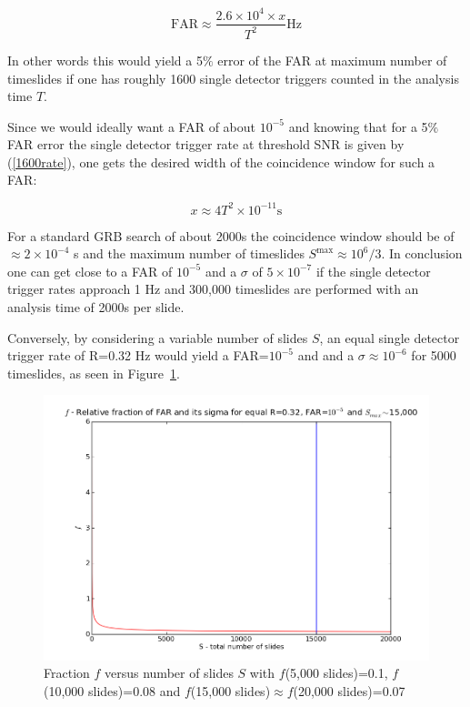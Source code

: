 \documentclass[epsf]{article}
\begin{document}
\begin{equation}
\mathrm{FAR} \approx \frac{2.6 \times 10^4 \times x}{T^2} \mathrm{Hz}
\end{equation}

In other words this would yield a 5$\%$ error of the FAR at maximum number of timeslides if one has roughly 1600 single detector triggers counted in the analysis time $T$.

Since we would ideally want a FAR of about $10^{-5}$ and knowing that for a 5$\%$ FAR error the single detector trigger rate at threshold SNR is given by (\ref{1600rate}), one gets the desired width of the coincidence window for such a FAR:

\begin{equation}
x \approx 4T^2 \times 10^{-11} \mathrm{s}
\end{equation}

For a standard GRB search of about 2000s the coincidence window should be of $\approx 2 \times 10^{-4}$ s and the maximum number of timeslides $S^{\mathrm{max}} \approx 10^6/3$. In conclusion one can get close to a FAR of $10^{-5}$ and a $\sigma$ of $5 \times 10^{-7}$ if the single detector trigger rates approach 1 Hz and 300,000 timeslides are performed with an analysis time of 2000s per slide.

Conversely, by considering a variable number of slides $S$, an equal single detector trigger rate of R=0.32 Hz would yield a FAR=$\mathrm{10}^{-5}$ and and a $\sigma \approx \mathrm{10}^{-6}$ for 5000 timeslides, as seen in Figure~\ref{figure2}.

\begin{figure}[ht!]
\label{figure2}
\centering
\includegraphics[scale=0.45]{R=032equal_rates.png}
\caption{Fraction $f$ versus number of slides $S$ with $f$(5,000 slides)=0.1, $f$(10,000 slides)=0.08 and $f$(15,000 slides)$\approx f$(20,000 slides)=0.07}
\end{figure}
\end{document}
